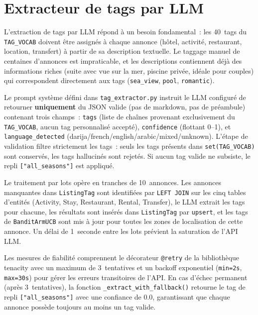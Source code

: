 \section{Extracteur de tags par LLM}

L'extraction de tags par LLM répond à un besoin fondamental~: les 40~tags du
\texttt{TAG\_VOCAB} doivent être assignés à chaque annonce (hôtel, activité, restaurant,
location, transfert) à partir de sa description textuelle. Le taggage manuel de centaines
d'annonces est impraticable, et les descriptions contiennent déjà des informations riches
(\og{}suite avec vue sur la mer, piscine privée, idéale pour couples\fg{}) qui correspondent
directement aux tags (\texttt{sea\_view}, \texttt{pool}, \texttt{romantic}).

Le prompt système défini dans \texttt{tag\_extractor.py} instruit le LLM configuré de
retourner \textbf{uniquement} du JSON valide (pas de markdown, pas de préambule) contenant
trois champs~: \texttt{tags} (liste de chaînes provenant exclusivement du \texttt{TAG\_VOCAB},
aucun tag personnalisé accepté), \texttt{confidence} (flottant 0--1), et
\texttt{language\_detected} (darija/french/english/arabic/mixed/unknown). L'étape de
validation filtre strictement les tags~: seuls les tags présents dans \texttt{set(TAG\_VOCAB)}
sont conservés, les tags hallucinés sont rejetés. Si aucun tag valide ne subsiste, le repli
\texttt{["all\_seasons"]} est appliqué.

Le traitement par lots opère en tranches de 10~annonces. Les annonces manquantes dans
\texttt{ListingTag} sont identifiées par \texttt{LEFT JOIN} sur les cinq tables d'entités
(Activity, Stay, Restaurant, Rental, Transfer), le LLM extrait les tags pour chacune, les
résultats sont insérés dans \texttt{ListingTag} par \texttt{upsert}, et les tags de
\texttt{BanditArmUCB} sont mis à jour pour toutes les zones de localisation de cette annonce.
Un délai de 1~seconde entre les lots prévient la saturation de l'API LLM.

Les mesures de fiabilité comprennent le décorateur \texttt{@retry} de la bibliothèque
tenacity avec un maximum de 3~tentatives et un backoff exponentiel (\texttt{min=2s},
\texttt{max=30s}) pour gérer les erreurs transitoires de l'API. En cas d'échec permanent
(après 3~tentatives), la fonction \texttt{\_extract\_with\_fallback()} retourne le tag de
repli \texttt{["all\_seasons"]} avec une confiance de 0.0, garantissant que chaque annonce
possède toujours au moins un tag valide.


